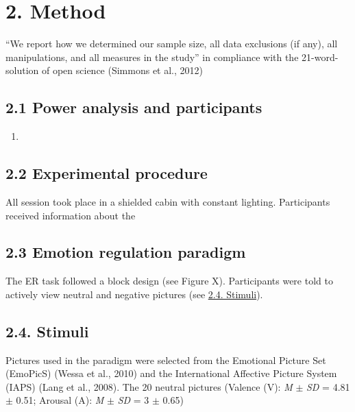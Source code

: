 \documentclass[
]{article}
\author{}
\date{\vspace{-2.5em}}
\providecommand{\tightlist}{%
  \setlength{\itemsep}{0pt}\setlength{\parskip}{0pt}}
\begin{document}
\hypertarget{method}{%
\section{2. Method}\label{method}}

``We report how we determined our sample size, all data exclusions (if
any), all manipulations, and all measures in the study'' in compliance
with the 21-word-solution of open science (Simmons et al., 2012)

\hypertarget{power-analysis-and-participants}{%
\subsection{2.1 Power analysis and
participants}\label{power-analysis-and-participants}}

\begin{enumerate}
\def\labelenumi{\roman{enumi}.}
\setcounter{enumi}{29}
\tightlist
\item
\end{enumerate}

\hypertarget{experimental-procedure}{%
\subsection{2.2 Experimental procedure}\label{experimental-procedure}}

All session took place in a shielded cabin with constant lighting.
Participants received information about the

\hypertarget{emotion-regulation-paradigm}{%
\subsection{2.3 Emotion regulation
paradigm}\label{emotion-regulation-paradigm}}

The ER task followed a block design (see Figure X). Participants were
told to actively view neutral and negative pictures (see
\protect\hyperlink{ux5cux23stimuli}{2.4. Stimuli}).

\hypertarget{stimuli}{%
\subsection{2.4. Stimuli}\label{stimuli}}

Pictures used in the paradigm were selected from the Emotional Picture
Set (EmoPicS) (Wessa et al., 2010) and the International Affective
Picture System (IAPS) (Lang et al., 2008). The 20 neutral pictures
(Valence (V): \emph{M} \(\pm\) \emph{SD} = 4.81 \(\pm\) 0.51; Arousal
(A): \emph{M} \(\pm\) \emph{SD} = 3 \(\pm\) 0.65)
\end{document}
